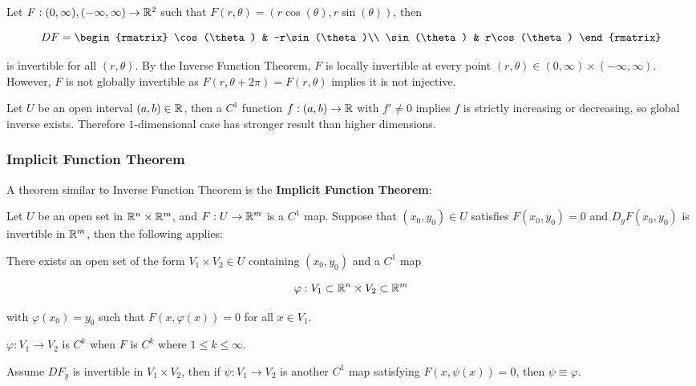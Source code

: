 \documentclass[a4paper,12pt]{article}
\begin{document}
\begin{exm}
  Let $F:(0,\infty),(-\infty,\infty)\to\mathbb{R}^{2}$ such that $F(r,\theta)=(r\cos(\theta),r\sin(\theta))$, then
  
  $$DF=\begin{rmatrix}
    \cos(\theta) & -r\sin(\theta)\\
    \sin(\theta) & r\cos(\theta)
  \end{rmatrix}$$\s

  is invertible for all $(r,\theta)$. By the Inverse Function Theorem, $F$ is locally invertible at every point $(r,\theta)\in(0,\infty)\times(-\infty,\infty)$. However, $F$ is not globally invertible as $F(r,\theta+2\pi)=F(r,\theta)$ implies it is not injective.
\end{exm}\n

\begin{exm}
  Let $U$ be an open interval $(a,b)\in\mathbb{R}$, then a $C^{1}$ function $f:(a,b)\to\mathbb{R}$ with $f'\neq 0$ implies $f$ is strictly increasing or decreasing, so global inverse exists. Therefore $1$-dimensional case has stronger result than higher dimensions.
\end{exm}

\subsubsection{Implicit Function Theorem}
A theorem similar to Inverse Function Theorem is the \textbf{Implicit Function Theorem}:\n

\begin{thm}
  Let $U$ be an open set in $\mathbb{R}^{n}\times\mathbb{R}^{m}$, and $F:U\to\mathbb{R}^{m}$ is a $C^{1}$ map. Suppose that $(x_{0},y_{0})\in U$ satisfies $F(x_{0},y_{0})=0$ and $D_{y}F(x_{0},y_{0})$ is invertible in $\mathbb{R}^{m}$, then the following applies:

  \begin{alist}
    \item There exists an open set of the form $V_{1}\times V_{2}\in U$ containing $(x_{0},y_{0})$ and a $C^{1}$ map
    
    $$\varphi:V_{1}\subset\mathbb{R}^{n}\times V_{2}\subset\mathbb{R}^{m}$$\s
    
    with $\varphi(x_{0})=y_{0}$ such that $F(x,\varphi(x))=0$ for all $x\in V_{1}$.
    \item $\varphi:V_{1}\to V_{2}$ is $C^{k}$ when $F$ is $C^{k}$ where $1\leq k\leq\infty$.
    \item Assume $DF_{y}$ is invertible in $V_{1}\times V_{2}$, then if $\psi:V_{1}\to V_{2}$ is another $C^{1}$ map satisfying $F(x,\psi(x))=0$, then $\psi\equiv\varphi$.
  \end{alist}
\end{thm}\n
\end{document}
